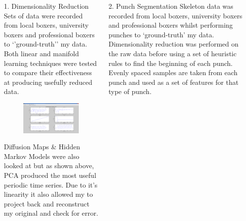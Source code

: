 \documentclass[ %
                    author={Liam O'Shea},
                supervisor={Dr. Sion Hannuna},
                     title={ZeroToHero},
                  subtitle={},
                    degree={Bsc},
                      year={2014} ]{poster}
\begin{document}
\begin{frame}{}
\begin{columns}[t]
    \begin{column}{0.422\linewidth}
    \begin{block}{\normalsize 1. Dimensionality Reduction}
    \small Sets of data were recorded from local boxers, university
        boxers and professional boxers to `'ground-truth'' my data.
        Both linear and manifold learning techniques were tested to compare their effectiveness at producing usefully reduced data. 
    \begin{figure}[h]
        \includegraphics[height=0.20\textheight]{images/drcomp}
    \end{figure}
        Diffusion Maps \& Hidden Markov Models were also looked at but as shown above, PCA produced the most useful periodic time series. Due to
         it's linearity it also allowed my to project back and reconstruct my original and check for error. 
    \end{block}
    \end{column}

    \begin{column}{0.422\linewidth}
    \begin{block}{\normalsize 2. Punch Segmentation}
    \small Skeleton data was recorded from local boxers, university boxers and professional boxers whilst performing punches to `ground-truth' my data. Dimensionality reduction was performed on the raw data before using a set of heuristic rules to find the beginning of each punch.
    Evenly spaced samples are taken from each punch and used as a set of features for that type of punch.

    

\end{block}
\end{column}
\end{columns}
\end{frame}
\end{document}
